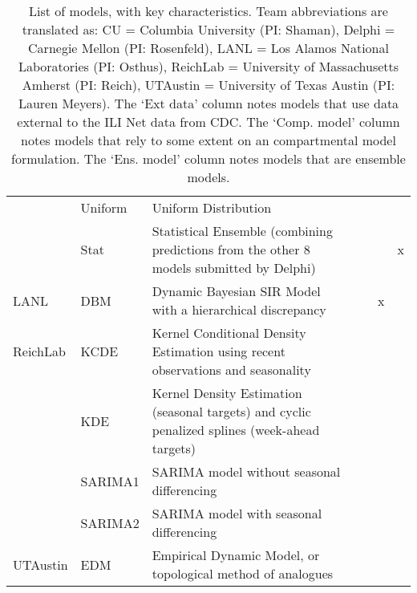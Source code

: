\begin{table}
\begin{tabular}{p{1.69cm} l p{7.5cm}  p{1.1cm}  p{1.1cm} p{1.1cm}}
~        & Uniform            & Uniform Distribution  & ~             & ~   &                 \\ 
~        & Stat               & Statistical Ensemble (combining predictions from the other 8 models submitted by Delphi) & ~             & ~  & x                 \\
\hline
LANL     & DBM                & Dynamic Bayesian SIR Model with a hierarchical discrepancy & ~             & x      &              \\ 
\hline
ReichLab & KCDE               & Kernel Conditional Density Estimation using recent observations and seasonality  & ~             & ~            &        \\ 
~        & KDE                & Kernel Density Estimation (seasonal targets) and cyclic penalized splines (week-ahead targets)  & ~             & ~     &               \\ 
~        & SARIMA1            & SARIMA model without seasonal differencing & ~             & ~      &              \\ 
~        & SARIMA2            & SARIMA model with seasonal differencing & ~             & ~           &         \\ 
\hline
UTAustin & EDM                & Empirical Dynamic Model, or topological method of analogues & ~             & ~         &           \\ 
\end{tabular}
\caption{List of models, with key characteristics. Team abbreviations are translated as: CU = Columbia University (PI: Shaman), Delphi = Carnegie Mellon (PI: Rosenfeld), LANL = Los Alamos National Laboratories (PI: Osthus), ReichLab = University of Massachusetts Amherst (PI: Reich), UTAustin = University of Texas Austin (PI: Lauren Meyers).  The `Ext data' column notes models that use data external to the ILI Net data from CDC. The `Comp. model' column notes models that rely to some extent on an compartmental model formulation. The `Ens. model' column notes models that are ensemble models.}
\label{tab:model-list}
\end{table}